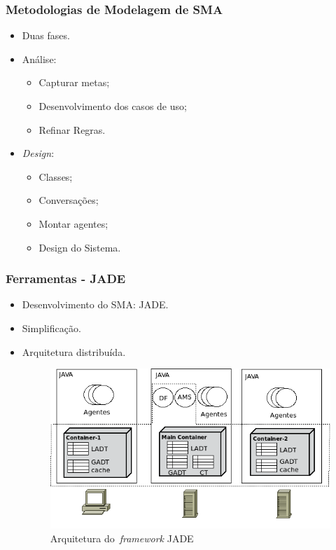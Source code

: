 \documentclass{beamer}
\begin{document}
\begin{frame}
    \frametitle{Metodologias de Modelagem de SMA}

	    \begin{itemize}
  		\item Duas fases.
  		\item Análise:
		\begin{itemize}
	  		\item Capturar metas;
	  		\item Desenvolvimento dos casos de uso;
			\item Refinar Regras.
		\end{itemize}
		\item \emph{Design}:
		\begin{itemize}
	  		\item Classes;
	  		\item Conversações;
			\item Montar agentes;
			\item Design do Sistema.
		\end{itemize}
	    \end{itemize}

\end{frame}

\begin{frame}
    \frametitle{Ferramentas - JADE}

	\begin{itemize}
  		\item Desenvolvimento do SMA: JADE.
		\item Simplificação.
		\item Arquitetura distribuída.
	     \begin{figure}[h]
	    	\centering \includegraphics[scale=0.5]{../images/arquitetura-jade.png}
    		\caption{Arquitetura do~\emph{framework} JADE}
		\label{arquiteturaJade} 
	    \end{figure}
	\end{itemize}
\end{frame}
\end{document}

